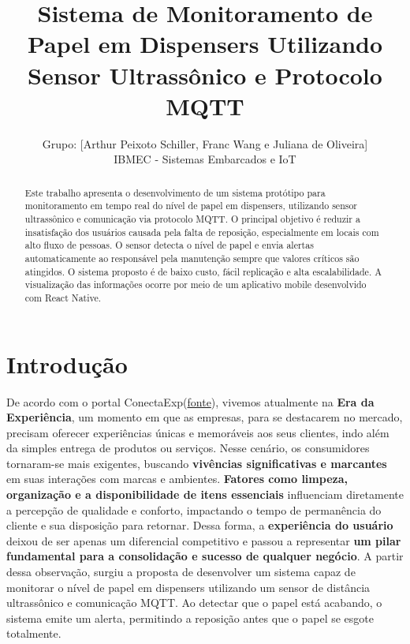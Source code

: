\documentclass[10pt,conference]{IEEEtran}
\title{Sistema de Monitoramento de Papel em Dispensers Utilizando Sensor Ultrassônico e Protocolo MQTT}
\author{Grupo: [Arthur Peixoto Schiller, Franc Wang e Juliana de Oliveira]\\
IBMEC - Sistemas Embarcados e IoT}\\
\begin{document}
\maketitle

\begin{abstract}
Este trabalho apresenta o desenvolvimento de um sistema protótipo para monitoramento em tempo real do nível de papel em dispensers, utilizando sensor ultrassônico e comunicação via protocolo MQTT. O principal objetivo é reduzir a insatisfação dos usuários causada pela falta de reposição, especialmente em locais com alto fluxo de pessoas. O sensor detecta o nível de papel e envia alertas automaticamente ao responsável pela manutenção sempre que valores críticos são atingidos. O sistema proposto é de baixo custo, fácil replicação e alta escalabilidade. A visualização das informações ocorre por meio de um aplicativo mobile desenvolvido com React Native.
\end{abstract}

\section{Introdução}
De acordo com o portal  ConectaExp(\href{https://conectaexp.com.br/a-era-da-experiencia-uma-jornada-de-conexao-e-transformacao/}{fonte}), vivemos atualmente na \textbf{Era da Experiência}, um momento em que as empresas, para se destacarem no mercado, precisam oferecer experiências únicas e memoráveis aos seus clientes, indo além da simples entrega de produtos ou serviços.
Nesse cenário, os consumidores tornaram-se mais exigentes, buscando \textbf{vivências significativas e marcantes} em suas interações com marcas e ambientes. \textbf{Fatores como limpeza, organização e a disponibilidade de itens essenciais} influenciam diretamente a percepção de qualidade e conforto, impactando o tempo de permanência do cliente e sua disposição para retornar.
Dessa forma, a \textbf{experiência do usuário} deixou de ser apenas um diferencial competitivo e passou a representar \textbf{um pilar fundamental para a consolidação e sucesso de qualquer negócio}.
A partir dessa observação, surgiu a proposta de desenvolver um sistema capaz de monitorar o nível de papel em dispensers utilizando um sensor de distância ultrassônico e comunicação MQTT. Ao detectar que o papel está acabando, o sistema emite um alerta, permitindo a reposição antes que o papel se esgote totalmente.
\end{document}
